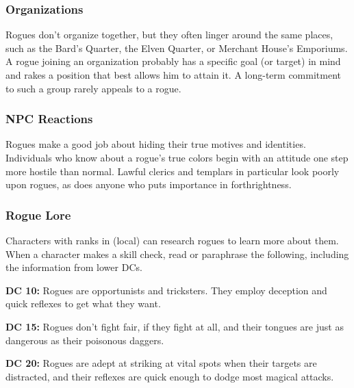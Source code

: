 \subsubsection{Organizations}
Rogues don't organize together, but they often linger around the same places, such as the Bard's Quarter, the Elven Quarter, or Merchant House's Emporiums. A rogue joining an organization probably has a specific goal (or target) in mind and rakes a position that best allows him to attain it. A long-term commitment to such a group rarely appeals to a rogue.

\subsubsection{NPC Reactions}
Rogues make a good job about hiding their true motives and identities. Individuals who know about a rogue's true colors begin with an attitude one step more hostile than normal. Lawful clerics and templars in particular look poorly upon rogues, as does anyone who puts importance in forthrightness.

\subsubsection{Rogue Lore}
Characters with ranks in  (local) can research rogues to learn more about them. When a character makes a skill check, read or paraphrase the following, including the information from lower DCs.

\textbf{DC 10:} Rogues are opportunists and tricksters. They employ deception and quick reflexes to get what they want.

\textbf{DC 15:} Rogues don't fight fair, if they fight at all, and their tongues are just as dangerous as their poisonous daggers.

\textbf{DC 20:} Rogues are adept at striking at vital spots when their targets are distracted, and their reflexes are quick enough to dodge most magical attacks.